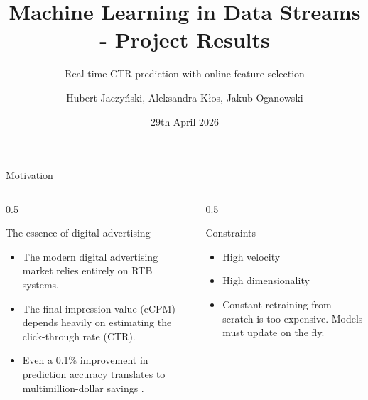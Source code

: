 \documentclass[aspectratio=169,xcolor=dvipsnames]{beamer}
\title[ML in Data Streams]{Machine Learning in Data Streams - Project Results}
\subtitle{Real-time CTR prediction with online feature selection}
\author[Jaczyński, Kłos, Oganowski]{Hubert Jaczyński, Aleksandra Kłos, Jakub Oganowski}
\institute[WUT]{
    Faculty of Mathematics and Information Science \\
    Warsaw University of Technology
}
\date{29th April 2026}
\begin{document}
\begin{frame}
    \titlepage
\end{frame}

\begin{frame}{Motivation}
\begin{columns}[T]
    \begin{column}{0.5\textwidth}
        \begin{block}{The essence of digital advertising}
        \small
        \begin{itemize}
            \item The modern digital advertising market relies entirely on RTB systems.
            \item The final impression value (eCPM) depends heavily on estimating the click-through rate (CTR).
            \item Even a 0.1\% improvement in prediction accuracy translates to multimillion-dollar savings \cite{mcmahan2013ad}.
        \end{itemize}
        \end{block}
    \end{column}

    \begin{column}{0.5\textwidth}
        \begin{block}{Constraints \cite{domingos2000mining}}
        \small
        \begin{itemize}
            \item High velocity
            \item High dimensionality 
            \item Constant retraining from scratch is too expensive. Models must update on the fly.
        \end{itemize}
        \end{block}
    \end{column}
\end{columns}
\end{frame}
\end{document}
